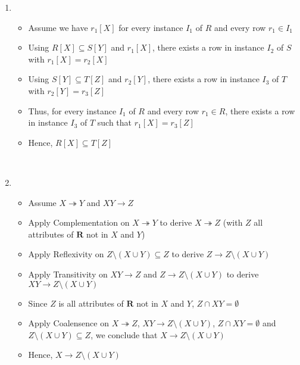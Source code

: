 \documentclass[12pt]{article}
\begin{document}
\begin{enumerate}
  \item
    \begin{itemize}
      \item Assume we have $r_1[X]$ for every instance $I_1$ of $R$ and every
            row $r_1 \in I_1$
      \item Using $R[X] \subseteq S[Y]$ and $r_1[X]$, there exists a row in
            instance $I_2$ of $S$ with $r_1[X] = r_2[X]$
      \item Using $S[Y] \subseteq T[Z]$ and $r_2[Y]$, there exists a row in
            instance $I_3$ of $T$ with $r_2[Y] = r_3[Z]$
      \item Thus, for every instance $I_1$ of $R$ and every row $r_1 \in R$,
            there exists a row in instance $I_3$ of $T$ such that $r_1[X] =
            r_3[Z]$
      \item Hence, $R[X] \subseteq T[Z]$
    \end{itemize}
  \ \\

  \item
    \begin{itemize}
      \item Assume $X \twoheadrightarrow Y$ and $XY \longrightarrow Z$
      \item Apply Complementation on $X \twoheadrightarrow Y$ to derive $X
            \twoheadrightarrow Z$ (with $Z$ all attributes of $\textbf{R}$ not
            in $X$ and $Y$)
      \item Apply Reflexivity on $Z \setminus (X \cup Y) \subseteq Z$ to derive
            $Z \longrightarrow Z \setminus (X \cup Y)$
      \item Apply Transitivity on $XY \longrightarrow Z$ and $Z \longrightarrow
            Z \setminus (X \cup Y)$ to derive $XY \longrightarrow Z \setminus (X
            \cup Y)$
      \item Since $Z$ is all attributes of $\textbf{R}$ not in $X$ and $Y$, $Z
            \cap XY = \emptyset$
      \item Apply Coalensence on $X \twoheadrightarrow Z$, $XY \longrightarrow Z
            \setminus (X \cup Y)$, $Z \cap XY = \emptyset$ and $Z \setminus (X
            \cup Y) \subseteq Z$, we conclude that $X \longrightarrow Z
            \setminus (X \cup Y)$
      \item Hence, $X \longrightarrow Z \setminus (X \cup Y)$
    \end{itemize}
  \ \\


\end{enumerate}
\end{document}
